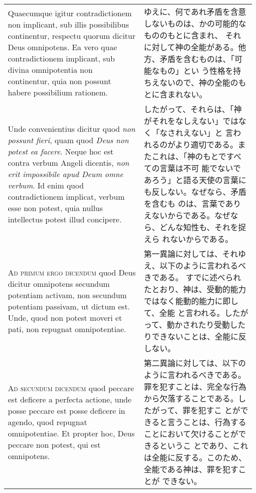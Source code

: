 \documentclass[10pt]{jsarticle} %
\begin{document}
\begin{longtable}{p{21em}p{21em}}
\\


Quaecumque igitur contradictionem non implicant, sub illis
possibilibus continentur, respectu quorum dicitur Deus omnipotens. Ea
vero quae contradictionem implicant, sub divina omnipotentia non
continentur, quia non possunt habere possibilium rationem. 


&

ゆえに、何であれ矛盾を含意しないものは、かの可能的なもののもとに含まれ、
 それに対して神の全能がある。他方、矛盾を含むものは、「可能なもの」とい
 う性格を持ちえないので、神の全能のもとに含まれない。

\\


Unde
convenientius dicitur quod {\itshape non possunt fieri}, quam quod {\itshape Deus non potest
ea facere}. Neque hoc est contra verbum Angeli dicentis, {\itshape non erit
impossibile apud Deum omne verbum}. Id enim quod contradictionem
implicat, verbum esse non potest, quia nullus intellectus potest illud
concipere.


&

したがって、それらは、「神がそれをなしえない」ではなく「なされえない」と
 言われるのがより適切である。またこれは、「神のもとですべての言葉は不可
 能でないであろう」と語る天使の言葉にも反しない。なぜなら、矛盾を含むも
 のは、言葉でありえないからである。なぜなら、どんな知性も、それを捉えら
 れないからである。

\\


{\scshape Ad primum ergo dicendum} quod Deus dicitur
omnipotens secundum potentiam activam, non secundum potentiam passivam,
ut dictum est. Unde, quod non potest moveri et pati, non repugnat
omnipotentiae.


&

第一異論に対しては、それゆえ、以下のように言われるべきである。
すでに述べられたとおり、神は、受動的能力ではなく能動的能力に即して、全能
 と言われる。したがって、動かされたり受動したりできないことは、全能に反
 しない。

\\


{\scshape Ad secundum dicendum} quod peccare est
deficere a perfecta actione, unde posse peccare est posse deficere in
agendo, quod repugnat omnipotentiae. Et propter hoc, Deus peccare non
potest, qui est omnipotens. 


&

第二異論に対しては、以下のように言われるべきである。
罪を犯すことは、完全な行為から欠落することである。したがって、罪を犯すこ
 とができると言うことは、行為することにおいて欠けることができるというこ
 とであり、これは全能に反する。このため、全能である神は、罪を犯すことが
 できない。




\end{longtable}
\end{document}
